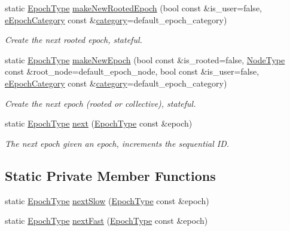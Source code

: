 \begin{DoxyCompactItemize}
static \hyperlink{namespacevt_a985a5adf291c34a3ca263b3378388236}{Epoch\+Type} \hyperlink{structvt_1_1epoch_1_1_epoch_manip_a78295c68a66b0ba88a1188e7e39b7d61}{make\+New\+Rooted\+Epoch} (bool const \&is\+\_\+user=false, \hyperlink{namespacevt_1_1epoch_a956abe0aceef0d10a988de8acb002c7c}{e\+Epoch\+Category} const \&\hyperlink{structvt_1_1epoch_1_1_epoch_manip_aa61d47033545df147c01036211c4cabe}{category}=default\+\_\+epoch\+\_\+category)
\begin{DoxyCompactList}\small\item\em Create the next rooted epoch, stateful. \end{DoxyCompactList}\item 
static \hyperlink{namespacevt_a985a5adf291c34a3ca263b3378388236}{Epoch\+Type} \hyperlink{structvt_1_1epoch_1_1_epoch_manip_ab744c3a392856694aa13a5c3a9da0841}{make\+New\+Epoch} (bool const \&is\+\_\+rooted=false, \hyperlink{namespacevt_a866da9d0efc19c0a1ce79e9e492f47e2}{Node\+Type} const \&root\+\_\+node=default\+\_\+epoch\+\_\+node, bool const \&is\+\_\+user=false, \hyperlink{namespacevt_1_1epoch_a956abe0aceef0d10a988de8acb002c7c}{e\+Epoch\+Category} const \&\hyperlink{structvt_1_1epoch_1_1_epoch_manip_aa61d47033545df147c01036211c4cabe}{category}=default\+\_\+epoch\+\_\+category)
\begin{DoxyCompactList}\small\item\em Create the next epoch (rooted or collective), stateful. \end{DoxyCompactList}\item 
static \hyperlink{namespacevt_a985a5adf291c34a3ca263b3378388236}{Epoch\+Type} \hyperlink{structvt_1_1epoch_1_1_epoch_manip_a6ae352a8b90f6dddbd76569cb7a47462}{next} (\hyperlink{namespacevt_a985a5adf291c34a3ca263b3378388236}{Epoch\+Type} const \&epoch)
\begin{DoxyCompactList}\small\item\em The next epoch given an epoch, increments the sequential ID. \end{DoxyCompactList}\end{DoxyCompactItemize}
\subsection*{Static Private Member Functions}
\begin{DoxyCompactItemize}
\item 
static \hyperlink{namespacevt_a985a5adf291c34a3ca263b3378388236}{Epoch\+Type} \hyperlink{structvt_1_1epoch_1_1_epoch_manip_a507bb5b29e034df10e1f8e12b920e666}{next\+Slow} (\hyperlink{namespacevt_a985a5adf291c34a3ca263b3378388236}{Epoch\+Type} const \&epoch)
\item 
static \hyperlink{namespacevt_a985a5adf291c34a3ca263b3378388236}{Epoch\+Type} \hyperlink{structvt_1_1epoch_1_1_epoch_manip_a22af1a8f72d23d10d56e1a72bf2f2500}{next\+Fast} (\hyperlink{namespacevt_a985a5adf291c34a3ca263b3378388236}{Epoch\+Type} const \&epoch)
\end{DoxyCompactItemize}
